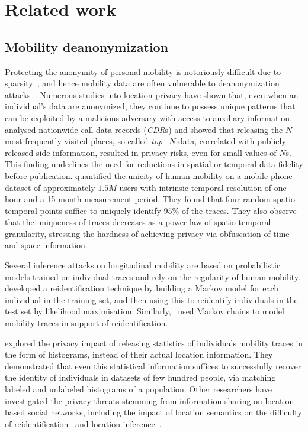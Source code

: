 \section{Related work}


\subsection{Mobility deanonymization}

Protecting the anonymity of personal mobility is notoriously difficult due to sparsity~\citep{aggarwal2008}, and hence mobility data are often vulnerable to deanonymization attacks~\citep{Narayanan2008}.
Numerous studies into location privacy have shown that, even when an individual's data are anonymized, they continue to possess unique patterns that can be exploited by a malicious adversary with access to auxiliary information.
\textcite{Zang2011} analysed nationwide call-data records (\emph{CDR}s) and showed that releasing the $N$ most frequently visited places, so called \emph{top$-N$} data, correlated with publicly released side information, resulted in privacy risks, even for small values of $N$s.
This finding underlines the need for reductions in spatial or temporal data fidelity before publication.
\textcite{DeMontjoye2013} quantified the unicity of human mobility on a mobile phone dataset of approximately $1.5M$ users with intrinsic temporal resolution of one hour and a 15-month measurement period.
They found that four random spatio-temporal points suffice to uniquely identify $ 95\% $ of the traces.
They also observe that the uniqueness of traces decreases as a power law of spatio-temporal granularity, stressing the hardness of achieving privacy via obfuscation of time and space information.

Several inference attacks on longitudinal mobility are based on probabilistic models trained on individual traces and rely on the regularity of human mobility.
\textcite{deMulder08} developed a reidentification technique by building a Markov model for each individual in the training set, and then using this to reidentify individuals in the test set by likelihood maximisation.
Similarly,~\textcite{Gambs2014} used Markov chains to model mobility traces in support of reidentification.

\textcite{Naini2016a} explored the privacy impact of releasing statistics of individuals mobility traces in the form of histograms, instead of their actual location information. They demonstrated that even this statistical information suffices to successfully recover the identity of individuals in datasets of few hundred people, via matching labeled and unlabeled histograms of a population.
Other researchers have investigated the privacy threats stemming from information sharing on location-based social networks, including the impact of location semantics on the difficulty of reidentification~\citep{privacyAndTheCity} and location inference~\citep{Agir}.

